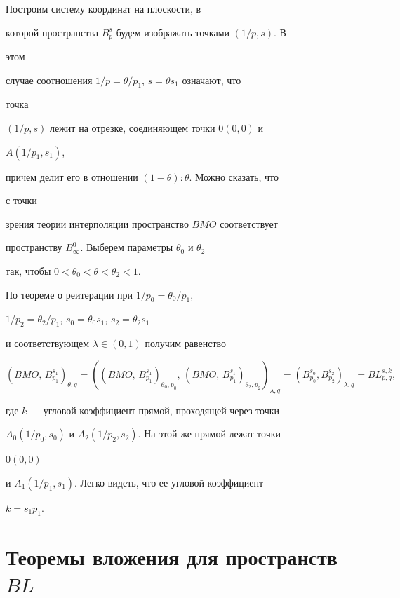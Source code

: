 \begin{pf} 


Построим систему координат на плоскости, в 


которой пространства $B^s_p$ будем изображать точками $(1/p,s)$. В 


этом 


случае соотношения $1/p=\theta/p_1$, $s=\theta s_1$ означают, что 


точка 


$(1/p,s)$ лежит на отрезке, соединяющем точки $0(0,0)$ и 


$A(1/p_1,s_1)$, 


причем делит его в отношении $(1-\theta){:}\theta$. Можно сказать, что 


с точки 


зрения теории интерполяции пространство $BMO$ соответствует 


пространству $B^0_\infty$. Выберем параметры $\theta_0$ и $\theta_2$ 


так, чтобы $0<\theta_0<\theta<\theta_2<1$. 


По теореме о реитерации при $1/p_0=\theta_0/p_1$, 


$1/p_2=\theta_2/p_1$, $s_0=\theta_0s_1$, $s_2=\theta_2s_1$ 


и соответствующем $\lambda\in(0,1)$ получим равенство 


$$ 


(BMO,\,B^{s_1}_{p_1})_{\theta,q}=((BMO,\, 


B^{s_1}_{p_1})_{\theta_0,p_0},\,(BMO,\, 


B^{s_1}_{p_1})_{\theta_2,p_2})_{\lambda,q}= 


(B^{s_0}_{p_0},B^{s_2}_{p_2})_{\lambda,q}=BL^{s,k}_{p,q}, 


$$ 


где $k$ --- угловой коэффициент прямой, проходящей через точки 


$A_0(1/p_0,s_0)$ и $A_2(1/p_2,s_2)$. На этой же прямой лежат точки 


$0(0,0)$ 


и $A_1(1/p_1,s_1)$. Легко видеть, что ее угловой коэффициент 


$k=s_1p_1$. 


\end{pf} 


 


\section{Теоремы вложения для пространств $BL$} 


